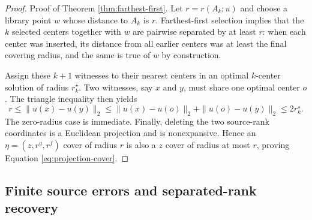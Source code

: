 \begin{proof}{Proof of Theorem \ref{thm:farthest-first}.}
Let $r=r(A_k;u)$ and choose a library point $w$ whose distance to $A_k$ is
$r$.  Farthest-first selection implies that the $k$ selected centers together
with $w$ are pairwise separated by at least $r$: when each center was inserted,
its distance from all earlier centers was at least the final covering radius,
and the same is true of $w$ by construction.

Assign these $k+1$ witnesses to their nearest centers in an optimal $k$-center
solution of radius $r_k^\star$.  Two witnesses, say $x$ and $y$, must share one
optimal center $o$.  The triangle inequality then yields
\[
 r\le\|u(x)-u(y)\|_2
 \le\|u(x)-u(o)\|_2+\|u(o)-u(y)\|_2
 \le2r_k^\star.
\]
The zero-radius case is immediate.  Finally, deleting the two source-rank
coordinates is a Euclidean projection and is nonexpansive.  Hence an
$\eta=(z,r^g,r^f)$ cover of radius $r$ is also a $z$ cover of radius at most
$r$, proving Equation \eqref{eq:projection-cover}.
\end{proof}

\subsection{Finite source errors and separated-rank recovery}
\label{app:proof-rank}

